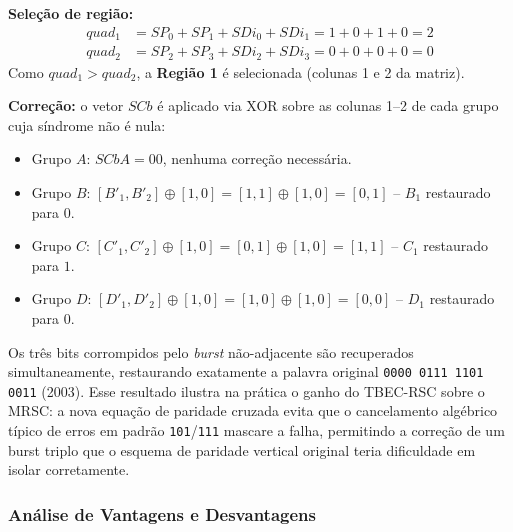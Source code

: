 \documentclass[12pt,a4paper]{article}
\begin{document}
\textbf{Seleção de região:}
\begin{align*}
    quad_1 &= SP_0+SP_1+SDi_0+SDi_1 = 1+0+1+0=2 \\
    quad_2 &= SP_2+SP_3+SDi_2+SDi_3 = 0+0+0+0=0
\end{align*}
Como $quad_1 > quad_2$, a \textbf{Região 1} é selecionada (colunas 1 e 2 
da matriz).

\textbf{Correção:} o vetor $SCb$ é aplicado via XOR sobre as colunas 1--2 
de cada grupo cuja síndrome não é nula:
\begin{itemize}
    \item Grupo $A$: $SCbA = 00$, nenhuma correção necessária.
    \item Grupo $B$: $[B'_1, B'_2] \oplus [1,0] = [1,1] \oplus [1,0] = [0,1]$ 
    -- $B_1$ restaurado para $0$.
    \item Grupo $C$: $[C'_1, C'_2] \oplus [1,0] = [0,1] \oplus [1,0] = [1,1]$ 
    -- $C_1$ restaurado para $1$.
    \item Grupo $D$: $[D'_1, D'_2] \oplus [1,0] = [1,0] \oplus [1,0] = [0,0]$ 
    -- $D_1$ restaurado para $0$.
\end{itemize}

Os três bits corrompidos pelo \textit{burst} não-adjacente são recuperados 
simultaneamente, restaurando exatamente a palavra original 
\texttt{0000\,0111\,1101\,0011} (2003). Esse resultado ilustra na prática o 
ganho do TBEC-RSC sobre o MRSC: a nova equação de paridade cruzada evita 
que o cancelamento algébrico típico de erros em padrão \texttt{101}/\texttt{111} 
mascare a falha, permitindo a correção de um burst triplo que o esquema de 
paridade vertical original teria dificuldade em isolar corretamente.

\subsubsection{Análise de Vantagens e Desvantagens}
\end{document}
